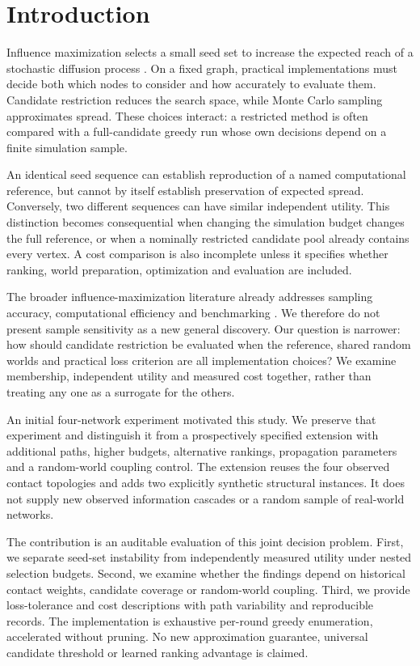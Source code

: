\documentclass[smallextended]{svjour3}
\begin{document}
\section{Introduction}
Influence maximization selects a small seed set to increase the expected reach of a stochastic diffusion process \cite{ref1}. On a fixed graph, practical implementations must decide both which nodes to consider and how accurately to evaluate them. Candidate restriction reduces the search space, while Monte Carlo sampling approximates spread. These choices interact: a restricted method is often compared with a full-candidate greedy run whose own decisions depend on a finite simulation sample.

An identical seed sequence can establish reproduction of a named computational reference, but cannot by itself establish preservation of expected spread. Conversely, two different sequences can have similar independent utility. This distinction becomes consequential when changing the simulation budget changes the full reference, or when a nominally restricted candidate pool already contains every vertex. A cost comparison is also incomplete unless it specifies whether ranking, world preparation, optimization and evaluation are included.

The broader influence-maximization literature already addresses sampling accuracy, computational efficiency and benchmarking \cite{ref2,ref8,ref9,ref10,ref16}. We therefore do not present sample sensitivity as a new general discovery. Our question is narrower: how should candidate restriction be evaluated when the reference, shared random worlds and practical loss criterion are all implementation choices? We examine membership, independent utility and measured cost together, rather than treating any one as a surrogate for the others.

An initial four-network experiment motivated this study. We preserve that experiment and distinguish it from a prospectively specified extension with additional paths, higher budgets, alternative rankings, propagation parameters and a random-world coupling control. The extension reuses the four observed contact topologies and adds two explicitly synthetic structural instances. It does not supply new observed information cascades or a random sample of real-world networks.

The contribution is an auditable evaluation of this joint decision problem. First, we separate seed-set instability from independently measured utility under nested selection budgets. Second, we examine whether the findings depend on historical contact weights, candidate coverage or random-world coupling. Third, we provide loss-tolerance and cost descriptions with path variability and reproducible records. The implementation is exhaustive per-round greedy enumeration, accelerated without pruning. No new approximation guarantee, universal candidate threshold or learned ranking advantage is claimed.
\end{document}
